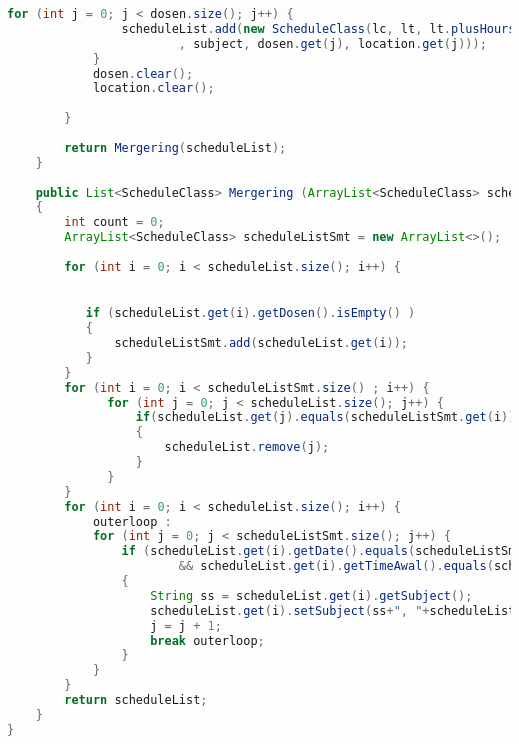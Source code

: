 \begin{lstlisting}[language=Java,basicstyle=\tiny,caption=ExcelConverter.java sebelum revisi,label=lst:ExcelConverterLama]
            for (int j = 0; j < dosen.size(); j++) {
                scheduleList.add(new ScheduleClass(lc, lt, lt.plusHours(2)
                        , subject, dosen.get(j), location.get(j)));
            }
            dosen.clear();
            location.clear();
           
        }
        
        return Mergering(scheduleList);
    }
    
    public List<ScheduleClass> Mergering (ArrayList<ScheduleClass> scheduleList)
    {
        int count = 0;
        ArrayList<ScheduleClass> scheduleListSmt = new ArrayList<>();
        
        for (int i = 0; i < scheduleList.size(); i++) {

           
           if (scheduleList.get(i).getDosen().isEmpty() )
           {
               scheduleListSmt.add(scheduleList.get(i));
           }
        }
        for (int i = 0; i < scheduleListSmt.size() ; i++) {
              for (int j = 0; j < scheduleList.size(); j++) {
                  if(scheduleList.get(j).equals(scheduleListSmt.get(i)))
                  {
                      scheduleList.remove(j);
                  }
              }
        }
        for (int i = 0; i < scheduleList.size(); i++) {
            outerloop :
            for (int j = 0; j < scheduleListSmt.size(); j++) {
                if (scheduleList.get(i).getDate().equals(scheduleListSmt.get(j).getDate())
                        && scheduleList.get(i).getTimeAwal().equals(scheduleListSmt.get(j).getTimeAwal()))
                {
                    String ss = scheduleList.get(i).getSubject();
                    scheduleList.get(i).setSubject(ss+", "+scheduleListSmt.get(j).getSubject());
                    j = j + 1;
                    break outerloop;
                }
            }
        }
        return scheduleList;
    }
}

\end{lstlisting}